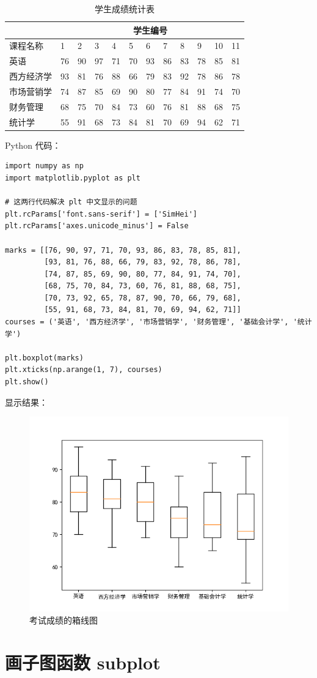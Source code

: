 \begin{table}[!ht]
\centering
\renewcommand{\arraystretch}{1.2}
\caption{学生成绩统计表}
\begin{tabular}{|l|l|l|l|l|l|l|l|l|l|l|l|}
\hline
&\multicolumn{11}{c|}{学生编号}  \\\hline
课程名称 & 1 & 2 & 3 & 4 & 5 & 6 & 7 & 8 & 9 & 10 & 11 \\ \hline
英语 & 76 & 90 & 97 & 71 & 70 & 93 & 86 & 83 & 78 & 85 & 81 \\ \hline
西方经济学 & 93 & 81 & 76 & 88 & 66 & 79 & 83 & 92 & 78 & 86 & 78 \\ \hline
市场营销学 & 74 & 87 & 85 & 69 & 90 & 80 & 77 & 84 & 91 & 74 & 70 \\ \hline
财务管理 & 68 & 75 & 70 & 84 & 73 & 60 & 76 & 81 & 88 & 68 & 75 \\ \hline
统计学 & 55 & 91 & 68 & 73 & 84 & 81 & 70 & 69 & 94 & 62 & 71 \\ \hline
\end{tabular}
\end{table}

Python 代码：
\begin{lstlisting}[Language=Python]
import numpy as np
import matplotlib.pyplot as plt

# 这两行代码解决 plt 中文显示的问题
plt.rcParams['font.sans-serif'] = ['SimHei']
plt.rcParams['axes.unicode_minus'] = False

marks = [[76, 90, 97, 71, 70, 93, 86, 83, 78, 85, 81],
         [93, 81, 76, 88, 66, 79, 83, 92, 78, 86, 78],
         [74, 87, 85, 69, 90, 80, 77, 84, 91, 74, 70],
         [68, 75, 70, 84, 73, 60, 76, 81, 88, 68, 75],
         [70, 73, 92, 65, 78, 87, 90, 70, 66, 79, 68],
         [55, 91, 68, 73, 84, 81, 70, 69, 94, 62, 71]]
courses = ('英语', '西方经济学', '市场营销学', '财务管理', '基础会计学', '统计学')

plt.boxplot(marks)
plt.xticks(np.arange(1, 7), courses)
plt.show()
\end{lstlisting}

显示结果：
\begin{figure}[!ht]
  \centering
  \includegraphics[scale=0.8]{figure/box.png}
  \caption{考试成绩的箱线图}\label{fig:box}
\end{figure}

\section{画子图函数 subplot}
